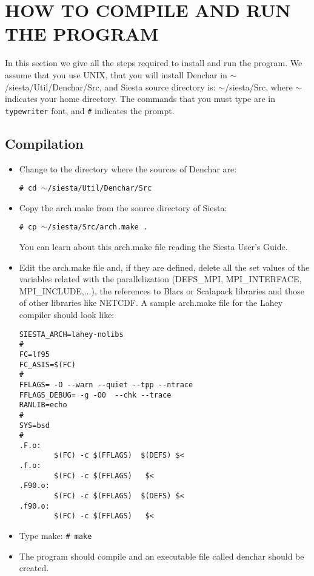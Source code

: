 \section{HOW TO COMPILE AND RUN THE PROGRAM}

In this section we give all the steps required to install
and run the program. 
We assume that you use UNIX, that you will install {\sc Denchar} in 
$\sim$/siesta/Util/Denchar/Src, and {\sc Siesta} source directory is:
$\sim$/siesta/Src,
where $\sim$ indicates your home directory.
The commands that you must type are in {\tt typewriter} font, 
and {\tt \#} indicates the prompt.

\subsection{Compilation}

  \begin{itemize}

   \item Change to the directory where the sources of {\sc Denchar} are:

         {\tt \# cd $\sim$/siesta/Util/Denchar/Src}

   \item Copy the arch.make from the source directory of {\sc Siesta}:

         {\tt \# cp $\sim$/siesta/Src/arch.make .}

         You can learn about this arch.make file reading the 
         {\sc Siesta} User's Guide.

   \item Edit the arch.make file and, if they are defined,
         delete all the set values
         of the variables related with the parallelization
         (DEFS\_MPI, MPI\_INTERFACE, MPI\_INCLUDE,...),   
         the references to Blacs or Scalapack libraries
         and those of other libraries like NETCDF.
         A sample arch.make file for the Lahey compiler
         should look like:

\begin{verbatim}
SIESTA_ARCH=lahey-nolibs
#
FC=lf95
FC_ASIS=$(FC)
#
FFLAGS= -O --warn --quiet --tpp --ntrace
FFLAGS_DEBUG= -g -O0  --chk --trace
RANLIB=echo
#
SYS=bsd
#
.F.o:
        $(FC) -c $(FFLAGS)  $(DEFS) $<
.f.o:
        $(FC) -c $(FFLAGS)   $<
.F90.o:
        $(FC) -c $(FFLAGS)  $(DEFS) $<
.f90.o:
        $(FC) -c $(FFLAGS)   $<
\end{verbatim}



   \item Type make:
         {\tt \# make}

   \item The program should compile and an executable file called
         denchar should be created.

  \end{itemize}

